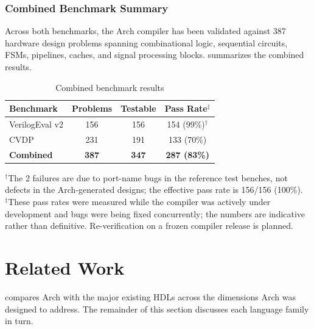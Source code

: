 \documentclass[11pt,twocolumn]{article}
\begin{document}
\subsubsection{Combined Benchmark Summary}

Across both benchmarks, the Arch compiler has been validated against 387 hardware design problems spanning combinational logic, sequential circuits, FSMs, pipelines, caches, and signal processing blocks.  summarizes the combined results.

\begin{table}[t]
\centering
\caption{Combined benchmark results}
\label{tab:combined}
\footnotesize
\begin{tabular}{@{}lccc@{}}
\toprule
\textbf{Benchmark} & \textbf{Problems} & \textbf{Testable} & \textbf{Pass Rate}$^\ddagger$ \\
\midrule
VerilogEval v2 & 156 & 156 & 154 (99\%)$^\dagger$ \\
CVDP & 231 & 191 & 133 (70\%) \\
\midrule
\textbf{Combined} & \textbf{387} & \textbf{347} & \textbf{287 (83\%)} \\
\bottomrule
\end{tabular}

\vspace{0.5em}
\raggedright\footnotesize
$^\dagger$The 2 failures are due to port-name bugs in the reference test benches, not defects in the Arch-generated designs; the effective pass rate is 156/156 (100\%).\\
$^\ddagger$These pass rates were measured while the compiler was actively under development and bugs were being fixed concurrently; the numbers are indicative rather than definitive. Re-verification on a frozen compiler release is planned.
\end{table}

\section{Related Work}\label{sec:related}

 compares Arch with the major existing HDLs across the dimensions Arch was designed to address. The remainder of this section discusses each language family in turn.
\end{document}
